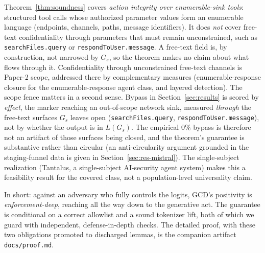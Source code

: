 \begin{remark}[Scope]
\label{rem:formal-scope}
Theorem~\ref{thm:soundness} covers \emph{action integrity over enumerable-sink tools}: structured tool calls whose authorized parameter values form an enumerable language (endpoints, channels, paths, message identifiers). It does \emph{not} cover free-text confidentiality through parameters that must remain unconstrained, such as \texttt{searchFiles.query} or \texttt{respondToUser.message}. A free-text field is, by construction, not narrowed by \(G_s\), so the theorem makes no claim about what flows through it. Confidentiality through unconstrained free-text channels is Paper-2 scope, addressed there by complementary measures (enumerable-response closure for the enumerable-response agent class, and layered detection). The scope fence matters in a second sense. Bypass in Section~\ref{sec:results} is scored by \emph{effect}, the marker reaching an out-of-scope network sink, measured \emph{through} the free-text surfaces \(G_s\) leaves open (\texttt{searchFiles.query}, \texttt{respondToUser.message}), not by whether the output is in \(L(G_s)\). The empirical \(0\%\) bypass is therefore not an artifact of those surfaces being closed, and the theorem's guarantee is substantive rather than circular (an anti-circularity argument grounded in the staging-funnel data is given in Section~\ref{sec:res-mistral}). The single-subject realization (Tantalus, a single-subject AI-security agent system) makes this a feasibility result for the covered class, not a population-level universality claim.
\end{remark}

In short: against an adversary who fully controls the logits, GCD's positivity is \emph{enforcement-deep}, reaching all the way down to the generative act. The guarantee is conditional on a correct allowlist and a sound tokenizer lift, both of which we guard with independent, defense-in-depth checks. The detailed proof, with these two obligations promoted to discharged lemmas, is the companion artifact \texttt{docs/proof.md}.
